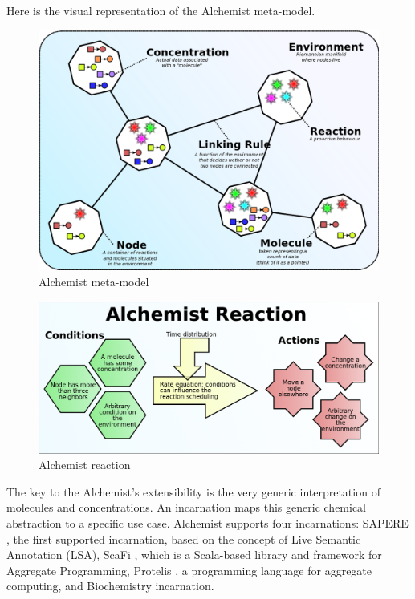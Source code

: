 \documentclass[12pt,a4paper,openright,twoside]{book}
\begin{document}
Here is the visual representation of the Alchemist meta-model.

\begin{figure}[h!]
  \centering
  \includegraphics[width=\textwidth]{figures/alchemist-model.png}
  \caption{Alchemist meta-model}
\end{figure}

\begin{figure}[h!]
  \centering
  \includegraphics[width=\textwidth]{figures/alchemist-reaction.png}
  \caption{Alchemist reaction}
\end{figure}

The key to the Alchemist's extensibility is the very generic interpretation of molecules and concentrations. An incarnation maps this generic chemical abstraction to a specific use case.
Alchemist supports four incarnations:
SAPERE \cite{DBLP:conf/saso/CastelliMRZ11}, the first supported incarnation, based on the concept of Live Semantic Annotation (LSA),
ScaFi \cite{DBLP:journals/softx/CasadeiVAP22}, which is a Scala-based library and framework for Aggregate Programming,
Protelis \cite{DBLP:conf/sac/PianiniVB15}, a programming language for aggregate computing, and
Biochemistry incarnation.
\end{document}
